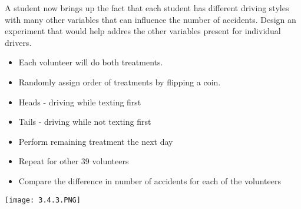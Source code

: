\documentclass[../stats.tex]{subfiles}
\begin{document}
\pagebreak
\begin{example}
    A student now brings up the fact that each student has different driving styles with many other variables that can influence the number of accidents. Design an experiment that would help addres the other variables present for individual drivers.

    \begin{itemize}
        \item Each volunteer will do both treatments.
        \item Randomly assign order of treatments by flipping a coin.
        \item Heads - driving while texting first 
        \item Tails - driving while not texting first 
        \item Perform remaining treatment the next day 
        \item Repeat for other 39 volunteers 
        \item Compare the difference in number of accidents for each of the volunteers 
    \end{itemize}

    \begin{center}
        \texttt{[image: 3.4.3.PNG]}
    \end{center}
\end{example}
\end{document}
